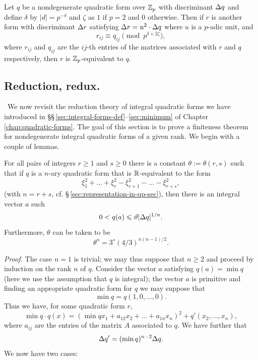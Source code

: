 \begin{theoremx}\label{thm:approximation-zp}
    Let \(q\) be a nondegenerate quadratic form over \(\mathbb{Z}_p\) with discriminant \({\Delta} q\) and define \(\delta\) by \(|d| = p^{-\delta}\) and \(\zeta\) as \(1\) if \(p = 2\) and \(0\) otherwise. Then if \(r\) is another form with discriminant \({\Delta} r\) satisfying \({\Delta} r = u^2\cdot {\Delta} q\) where \(u\) is a \(p\)-adic unit, and
    \[
        r_{ij} \equiv q_{ij} \pmod{p^{\delta + 2\zeta}},  
    \]
    where \(r_{ij}\) and \(q_{ij}\) are the \(ij\)-th entries of the matrices associated with \(r\) and \(q\) respectively, then \(r\) is \(\mathbb{Z}_p\)-equivalent to \(q\).
\end{theoremx}

\subsection{Reduction, redux.}~We now revisit the reduction theory of integral quadratic forms we have introduced in \S\S\,\ref{sec:integral-forms-def}--\ref{sec:minimum} of Chapter\,\ref{chap:quadratic-forms}. The goal of this section is to prove a finiteness theorem for nondegenerate integral quadratic forms of a given rank. We begin with a couple of lemmas.\label{sec:integral-reduction-redux}

\begin{lemmax}\label{lemma:theta-inequality}
    {\normalfont\cite[p.\,136]{cassels2008rational}}
    For all pairs of integers \(r \geq 1\) and \(s \geq 0\) there is a constant \(\theta := \theta(r, s)\) such that if \(q\) is a \(n\)-ary quadratic form that is \(\mathbb{R}\)-equivalent to the form
    \[
        \xi_1^2 + \dots + \xi_r^2 - \xi_{r+1}^2 - \dots - \xi_{r+s}^2,
    \]
    (with \(n = r + s\), cf. \S\,\ref{sec:representation-in-qp-sec}), then there is an integral vector \(a\) such
    \[
        0 < q(a) \leqslant \vartheta |{\Delta} q|^{1/n}.
    \]
    Furthermore, \(\theta\) can be taken to be
    \begin{equation}
        \label{eq:theta-inequality}
        \theta^n = 3^s (4/3)^{n(n-1)/2}.
    \end{equation}
\end{lemmax}

\emph{Proof.} The case \(n = 1\) is trivial; we may thus suppose that \(n \geq 2\) and proceed by induction on the rank \(n\) of \(q\). Consider the vector \(a\) satisfying \(q(a) = \min q\) (here we use the assumption that \(q\) is integral); the vector \(a\) is primitive and finding an appropriate quadratic form for \(q\) we may suppose that
\[
    \min q = q(1, 0, \dots, 0).
\]
Thus we have, for some quadratic form \(r\),
\[
    \min q \cdot q(x) =(\min q x_1 + a_{12} x_2 + \dots + a_{1n} x_n)^2 + q'(x_2, \dots, x_n),
\]
where \(a_{ij}\) are the entries of the matrix \(A\) associated to \(q\). We have further that
\[
    {\Delta} q' = (\min q)^{n-2}{\Delta} q.
\]
We now have two cases:

